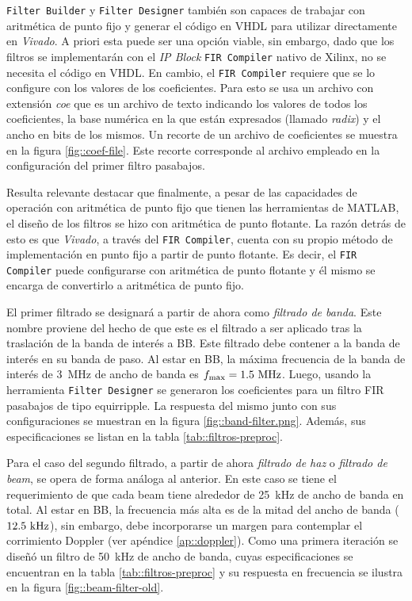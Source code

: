 \documentclass[../../main.tex]{subfiles}
\begin{document}
\texttt{Filter Builder} y \texttt{Filter Designer} también son capaces de trabajar con aritmética de punto fijo y generar el código en VHDL para utilizar directamente en \textit{Vivado}. A priori esta puede ser una opción viable, sin embargo, dado que los filtros se implementarán con el \textit{IP Block} \texttt{FIR Compiler} nativo de Xilinx, no se necesita el código en VHDL. En cambio, el \texttt{FIR Compiler} requiere que se lo configure con los valores de los coeficientes. Para esto se usa un archivo con extensión \textit{coe} que es un archivo de texto indicando los valores de todos los coeficientes, la base numérica en la que están expresados (llamado \textit{radix}) y el ancho en bits de los mismos. Un recorte de un archivo de coeficientes se muestra en la figura \ref{fig::coef-file}. Este recorte corresponde al archivo empleado en la configuración del primer filtro pasabajos.

Resulta relevante destacar que finalmente, a pesar de las capacidades de operación con aritmética de punto fijo que tienen las herramientas de MATLAB, el diseño de los filtros se hizo con aritmética de punto flotante. La razón detrás de esto es que \textit{Vivado}, a través del \texttt{FIR Compiler}, cuenta con su propio método de implementación en punto fijo a partir de punto flotante. Es decir, el \texttt{FIR Compiler} puede configurarse con aritmética de punto flotante y él mismo se encarga de convertirlo a aritmética de punto fijo.

El primer filtrado se designará a partir de ahora como \textit{filtrado de banda}. Este nombre proviene del hecho de que este es el filtrado a ser aplicado tras la traslación de la banda de interés a BB. Este filtrado debe contener a la banda de interés en su banda de paso. Al estar en BB, la máxima frecuencia de la banda de interés de 3~MHz de ancho de banda es $f_\textrm{max} = 1.5~\textrm{MHz}$. Luego, usando la herramienta \texttt{Filter Designer} se generaron los coeficientes para un filtro FIR pasabajos de tipo equirripple. La respuesta del mismo junto con sus configuraciones se muestran en la figura \ref{fig::band-filter.png}. Además, sus especificaciones se listan en la tabla \ref{tab::filtros-preproc}.

Para el caso del segundo filtrado, a partir de ahora \textit{filtrado de haz} o \textit{filtrado de beam}, se opera de forma análoga al anterior. En este caso se tiene el requerimiento de que cada beam tiene alrededor de 25~kHz de ancho de banda en total. Al estar en BB, la frecuencia más alta es de la mitad del ancho de banda ($12.5~\textrm{kHz}$), sin embargo, debe incorporarse un margen para contemplar el corrimiento Doppler (ver apéndice \ref{ap::doppler}). Como una primera iteración se diseñó un filtro de 50~kHz de ancho de banda, cuyas especificaciones se encuentran en la tabla \ref{tab::filtros-preproc} y su respuesta en frecuencia se ilustra en la figura \ref{fig::beam-filter-old}.
\end{document}
